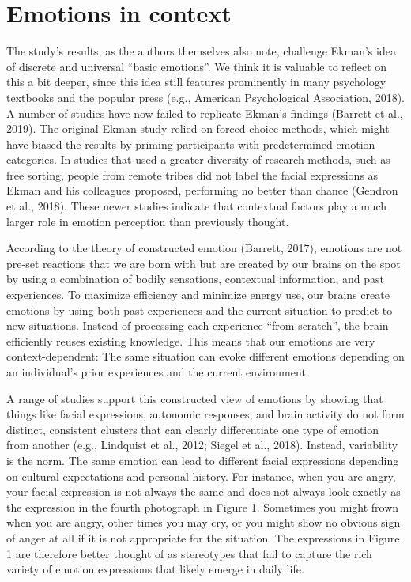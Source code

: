 \documentclass[authordate, reflection,issue]{jote-new-article}
\begin{document}
	\section{Emotions in context}



	The study's results, as the authors themselves also note, challenge Ekman's idea of discrete and universal “basic emotions”. We think it is valuable to reflect on this a bit deeper, since this idea still features prominently in many psychology textbooks and the popular press (e.g., American Psychological Association, 2018). A number of studies have now failed to replicate Ekman's findings (Barrett et al., 2019). The original Ekman study relied on forced-choice methods, which might have biased the results by priming participants with predetermined emotion categories. In studies that used a greater diversity of research methods, such as free sorting, people from remote tribes did not label the facial expressions as Ekman and his colleagues proposed, performing no better than chance (Gendron et al., 2018). These newer studies indicate that contextual factors play a much larger role in emotion perception than previously thought.



	According to the theory of constructed emotion (Barrett, 2017), emotions are not pre-set reactions that we are born with but are created by our brains on the spot by using a combination of bodily sensations, contextual information, and past experiences. To maximize efficiency and minimize energy use, our brains create emotions by using both past experiences and the current situation to predict to new situations. Instead of processing each experience “from scratch”, the brain efficiently reuses existing knowledge. This means that our emotions are very context-dependent: The same situation can evoke different emotions depending on an individual's prior experiences and the current environment.



	A range of studies support this constructed view of emotions by showing that things like facial expressions, autonomic responses, and brain activity do not form distinct, consistent clusters that can clearly differentiate one type of emotion from another (e.g., Lindquist et al., 2012; Siegel et al., 2018). Instead, variability is the norm. The same emotion can lead to different facial expressions depending on cultural expectations and personal history. For instance, when you are angry, your facial expression is not always the same and does not always look exactly as the expression in the fourth photograph in Figure 1. Sometimes you might frown when you are angry, other times you may cry, or you might show no obvious sign of anger at all if it is not appropriate for the situation. The expressions in Figure 1 are therefore better thought of as stereotypes that fail to capture the rich variety of emotion expressions that likely emerge in daily life.
\end{document}
